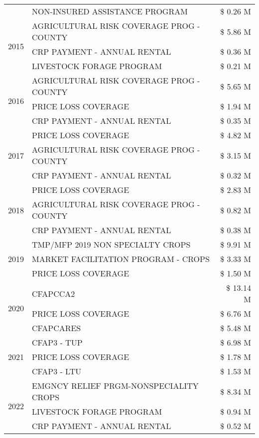 \begin{tabular}{llr}
 & NON-INSURED ASSISTANCE PROGRAM & \$ 0.26 M \\
\cline{1-3}
\multirow[t]{3}{*}{2015} & AGRICULTURAL RISK COVERAGE PROG - COUNTY & \$ 5.86 M \\
 & CRP PAYMENT - ANNUAL RENTAL & \$ 0.36 M \\
 & LIVESTOCK FORAGE PROGRAM & \$ 0.21 M \\
\cline{1-3}
\multirow[t]{3}{*}{2016} & AGRICULTURAL RISK COVERAGE PROG - COUNTY & \$ 5.65 M \\
 & PRICE LOSS COVERAGE & \$ 1.94 M \\
 & CRP PAYMENT - ANNUAL RENTAL & \$ 0.35 M \\
\cline{1-3}
\multirow[t]{3}{*}{2017} & PRICE LOSS COVERAGE & \$ 4.82 M \\
 & AGRICULTURAL RISK COVERAGE PROG - COUNTY & \$ 3.15 M \\
 & CRP PAYMENT - ANNUAL RENTAL & \$ 0.32 M \\
\cline{1-3}
\multirow[t]{3}{*}{2018} & PRICE LOSS COVERAGE & \$ 2.83 M \\
 & AGRICULTURAL RISK COVERAGE PROG - COUNTY & \$ 0.82 M \\
 & CRP PAYMENT - ANNUAL RENTAL & \$ 0.38 M \\
\cline{1-3}
\multirow[t]{3}{*}{2019} & TMP/MFP 2019 NON SPECIALTY CROPS & \$ 9.91 M \\
 & MARKET FACILITATION PROGRAM - CROPS & \$ 3.33 M \\
 & PRICE LOSS COVERAGE & \$ 1.50 M \\
\cline{1-3}
\multirow[t]{3}{*}{2020} & CFAPCCA2 & \$ 13.14 M \\
 & PRICE LOSS COVERAGE & \$ 6.76 M \\
 & CFAPCARES & \$ 5.48 M \\
\cline{1-3}
\multirow[t]{3}{*}{2021} & CFAP3 - TUP & \$ 6.98 M \\
 & PRICE LOSS COVERAGE & \$ 1.78 M \\
 & CFAP3 - LTU & \$ 1.53 M \\
\cline{1-3}
\multirow[t]{3}{*}{2022} & EMGNCY RELIEF PRGM-NONSPECIALITY CROPS & \$ 8.34 M \\
 & LIVESTOCK FORAGE PROGRAM & \$ 0.94 M \\
 & CRP PAYMENT - ANNUAL RENTAL & \$ 0.52 M \\
\cline{1-3}
\bottomrule
\end{tabular}
